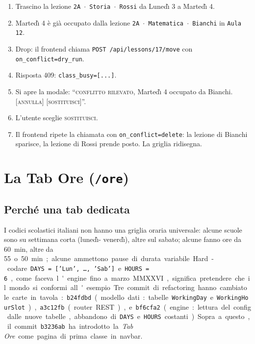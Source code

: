 \begin{esempiobox}[title={Drop con conflitto, raccontato passo passo}]
\begin{enumerate}
  \item Trascino la lezione \texttt{2A\,$\cdot$\,Storia\,$\cdot$\,Rossi}
    da Luned\`{\i} 3 a Marted\`{\i} 4.
  \item Marted\`{\i} 4 \`e gi\`a occupato dalla lezione
    \texttt{2A\,$\cdot$\,Matematica\,$\cdot$\,Bianchi} in
    \texttt{Aula 12}.
  \item Drop: il frontend chiama
    \texttt{POST /api/lessons/17/move} con
    \texttt{on\_conflict=dry\_run}.
  \item Risposta 409: \texttt{class\_busy=[...]}.
  \item Si apre la modale: ``\textsc{conflitto rilevato},
    Marted\`{\i} 4 occupato da Bianchi.\hfill
    [\textsc{annulla}] [\textsc{sostituisci}]''.
  \item L'utente sceglie \textsc{sostituisci}.
  \item Il frontend ripete la chiamata con
    \texttt{on\_conflict=delete}: la lezione di Bianchi sparisce,
    la lezione di Rossi prende posto. La griglia ridisegna.
\end{enumerate}
\end{esempiobox}

\section{La Tab Ore (\texttt{/ore})}

\label{sec:tab-ore}

\subsection{Perch\'e una tab dedicata}

I codici scolastici italiani non hanno una griglia oraria
universale: alcune scuole sono su settimana corta (luned\`{\i}-
venerd\`{\i}), altre sul sabato; alcune fanno ore da \SI{60}{\minute},
altre da \SI{55} o \SI{50}{\minute}; alcune ammettono pause di
durata variabile. Hard-codare \texttt{DAYS = ['Lun', \dots, 'Sab']}
e \texttt{HOURS = 6}, come faceva l'engine fino a marzo MMXXVI,
significa pretendere che il mondo si conformi all'esempio.

Tre commit di refactoring hanno cambiato le carte in tavola:
\texttt{b24fdbd} (modello dati: tabelle \texttt{WorkingDay} e
\texttt{WorkingHourSlot}), \texttt{a3c12fb} (router REST), e
\texttt{bf6cfa2} (engine: lettura del config dalle nuove tabelle,
abbandono di \texttt{DAYS} e \texttt{HOURS} costanti). Sopra a
questo, il commit \texttt{b3236ab} ha introdotto la \emph{Tab
Ore} come pagina di prima classe in navbar.

